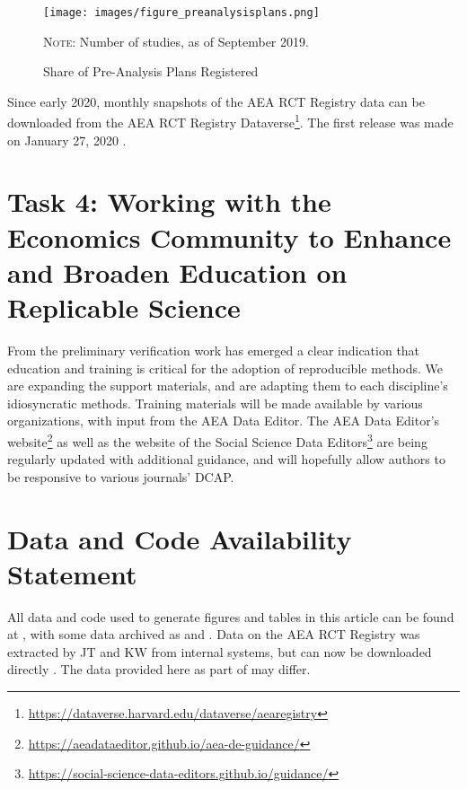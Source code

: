 \documentclass[PP]{AEA}
\newcommand{\urlcite}[2]{#2\footnote{\url{#1}}}
\begin{document}
\begin{figure}[h]
	\texttt{[image: images/figure\_preanalysisplans.png]}
    \caption{Share of Pre-Analysis Plans Registered\label{fig:rct_pap}}
	
	\centering \footnotesize \textsc{Note:} Number of studies, as of September 2019.
\end{figure} 

Since early 2020, monthly snapshots of the AEA RCT Registry data can be downloaded from the \urlcite{https://dataverse.harvard.edu/dataverse/aearegistry}{AEA RCT Registry Dataverse}. The first release was made on January 27, 2020 \citep{DVN/DFMLIU_2020}.

\section{Task 4: Working with the Economics Community to Enhance and Broaden Education on Replicable Science}

From the preliminary verification work has emerged a clear indication that education and training is critical for the adoption of reproducible methods. We are expanding the support materials, and are adapting them to each discipline's idiosyncratic methods. Training materials will be made available by various organizations, with input from the AEA Data Editor. The \urlcite{https://aeadataeditor.github.io/aea-de-guidance/}{AEA Data Editor's website} as well as the website of the \urlcite{https://social-science-data-editors.github.io/guidance/}{Social Science Data Editors} are being regularly updated with additional guidance, and will hopefully allow authors to be responsive to various journals' \ac{DCAP}.

\section{Data and Code Availability Statement}
\label{sec:dcas}

All data and code used to generate figures and tables in this article can be found at \citet{E117884V1}, with some data archived as \citet{E117873V1} and \citet{E117876V1}. Data on the AEA RCT Registry was extracted by JT and KW from internal systems, but can now be downloaded directly \citep{DVN/DFMLIU_2020}. The data provided here as part of \citet{E117884V1} may differ.
\end{document}
